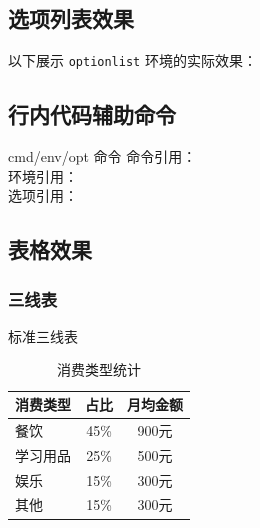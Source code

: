 \documentclass[linux]{hustreport}
\begin{document}
\subsection{选项列表效果}

以下展示 \texttt{optionlist} 环境的实际效果：

\begin{optionlist}
\end{optionlist}

\subsection{行内代码辅助命令}

\begin{democode}{cmd/env/opt 命令}
命令引用： \\
环境引用： \\
选项引用：
\end{democode}

\subsection{表格效果}

\subsubsection{三线表}

\begin{demovert}{标准三线表}
\begin{table}[H]
\centering
\caption{消费类型统计}
\begin{tabular}{lcc}
\toprule
消费类型 & 占比 & 月均金额 \\
\midrule
餐饮 & 45\% & 900元 \\
学习用品 & 25\% & 500元 \\
娱乐 & 15\% & 300元 \\
其他 & 15\% & 300元 \\
\bottomrule
\end{tabular}
\end{table}
\end{demovert}
\end{document}
